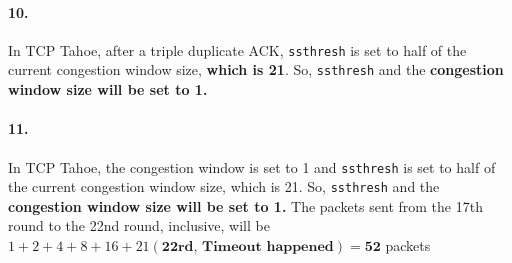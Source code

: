 \documentclass{cshwk}
\begin{document}
\paragraph{10.} In TCP Tahoe, after a triple duplicate ACK, \texttt{ssthresh} is set to half of the current congestion window size, \textbf{which is 21}. So, \texttt{ssthresh} and the \textbf{congestion window size will be set to 1.}

\paragraph{11.} In TCP Tahoe, the congestion window is set to 1 and \texttt{ssthresh} is set to half of the current congestion window size, which is 21. So, \texttt{ssthresh} and the \textbf{congestion window size will be set to 1.} The packets sent from the 17th round to the 22nd round, inclusive, will be $1+2+4+8+16+21(\textbf{22rd, Timeout happened}) = \mathbf{52}$ packets
\end{document}
